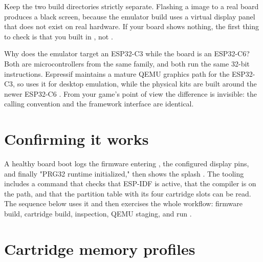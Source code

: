 

\begin{prgwarn}
Keep the two build directories strictly separate. Flashing a 
image to a real board produces a black screen, because the emulator build uses a
virtual display panel that does not exist on real hardware. If your board shows
nothing, the first thing to check is that you built in , not
 \citep{prg32qemu}.
\end{prgwarn}

\begin{prgaside}
Why does the emulator target an ESP32\nobreakdash-C3 while the board is an ESP32\nobreakdash-C6? Both
are \riscv microcontrollers from the same family, and both run the same 32-bit
\riscv instructions. Espressif maintains a mature QEMU graphics path for the
ESP32\nobreakdash-C3, so \prg uses it for desktop emulation, while the physical kits are
built around the newer ESP32\nobreakdash-C6 \citep{prg32qemu}. From your game's point of
view the difference is invisible: the calling convention and the framework
interface are identical.
\end{prgaside}

\section{Confirming it works}

A healthy board boot logs the firmware entering , the configured
display pins, and finally "PRG32 runtime initialized," then shows the splash
\citep{prg32tutorial}. The tooling includes a  command that checks
that ESP-IDF is active, that the \riscv compiler is on the path, and that the
partition table with its four cartridge slots can be read. The sequence below
uses it and then exercises the whole workflow: firmware build, cartridge build,
inspection, QEMU staging, and run \citep{prg32repo}.



\section{Cartridge memory profiles}

